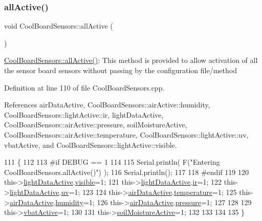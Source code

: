 \subsubsection{\texorpdfstring{all\+Active()}{allActive()}}
{\footnotesize\ttfamily void Cool\+Board\+Sensors\+::all\+Active (\begin{DoxyParamCaption}{ }\end{DoxyParamCaption})}

\hyperlink{classCoolBoardSensors_aa432c5aac88f89c31a10766390f23e0b}{Cool\+Board\+Sensors\+::all\+Active()}\+: This method is provided to allow activation of all the sensor board sensors without passing by the configuration file/method 

Definition at line 110 of file Cool\+Board\+Sensors.\+cpp.



References air\+Data\+Active, Cool\+Board\+Sensors\+::air\+Active\+::humidity, Cool\+Board\+Sensors\+::light\+Active\+::ir, light\+Data\+Active, Cool\+Board\+Sensors\+::air\+Active\+::pressure, soil\+Moisture\+Active, Cool\+Board\+Sensors\+::air\+Active\+::temperature, Cool\+Board\+Sensors\+::light\+Active\+::uv, vbat\+Active, and Cool\+Board\+Sensors\+::light\+Active\+::visible.


\begin{DoxyCode}
111 \{
112 
113 \textcolor{preprocessor}{#if DEBUG == 1 }
114 
115     Serial.println( F(\textcolor{stringliteral}{"Entering CoolBoardSensors.allActive()"}) );
116     Serial.println();
117 
118 \textcolor{preprocessor}{#endif}
119     
120     this->\hyperlink{classCoolBoardSensors_ac4deb1cf41bac8b91c780c92fab00ba4}{lightDataActive}.\hyperlink{structCoolBoardSensors_1_1lightActive_abcbba296b6a95e67c0cd2555d9dd50c7}{visible}=1;
121     this->\hyperlink{classCoolBoardSensors_ac4deb1cf41bac8b91c780c92fab00ba4}{lightDataActive}.\hyperlink{structCoolBoardSensors_1_1lightActive_a67700895349b95ceb263f1a6da756315}{ir}=1;
122     this->\hyperlink{classCoolBoardSensors_ac4deb1cf41bac8b91c780c92fab00ba4}{lightDataActive}.\hyperlink{structCoolBoardSensors_1_1lightActive_a949a7aaf5166d981de8fe0fd93da20d6}{uv}=1;    
123 
124     this->\hyperlink{classCoolBoardSensors_abff8dfeccb2f7689847bb64d5f1cd31e}{airDataActive}.\hyperlink{structCoolBoardSensors_1_1airActive_a9a6633c426b0508e30ebc1832ec6d745}{temperature}=1;
125     this->\hyperlink{classCoolBoardSensors_abff8dfeccb2f7689847bb64d5f1cd31e}{airDataActive}.\hyperlink{structCoolBoardSensors_1_1airActive_ae5740445054b27415e22f450576accb7}{humidity}=1;
126     this->\hyperlink{classCoolBoardSensors_abff8dfeccb2f7689847bb64d5f1cd31e}{airDataActive}.\hyperlink{structCoolBoardSensors_1_1airActive_ab200826a70d1dc9945f5efb6b9c732ed}{pressure}=1;
127 
128 
129     this->\hyperlink{classCoolBoardSensors_af5039ad760b0ff0aa7eee16c55e81702}{vbatActive}=1;
130 
131     this->\hyperlink{classCoolBoardSensors_a31983eecc0f9cd000e1f912206ea4dc8}{soilMoistureActive}=1;
132     
133 
134 
135 \}
\end{DoxyCode}
\mbox{\label{classCoolBoardSensors_a97095823ef7c8f5290812f1405b966b3}} 
